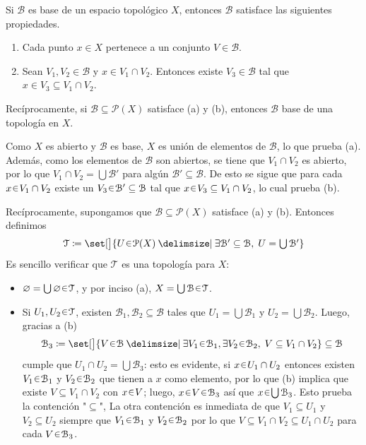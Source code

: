 \begin{ejer}
Si $\mathcal{B}$ es base de un espacio topológico $X$, entonces $\mathcal{B}$ satisface las siguientes propiedades.
\begin{enumerate}[label = (\alph*)]
    \item Cada punto $x\in X$ pertenece a un conjunto $V\in\mathcal{B}$.
    \item Sean $V_{1},V_{2}\in\mathcal{B}$ y $x\in V_{1}\cap V_{2}$. Entonces existe $V_{3}\in\mathcal{B}$ tal que $x\in V_{3}\subseteq V_{1}\cap V_{2}$.
\end{enumerate}
Recíprocamente, si $\mathcal{B}\subseteq\mathcal{P}(X)$ satisface (a) y (b), entonces $\mathcal{B}$ base de una topología en $X$.
\end{ejer}
\begin{sol}[Demostración]
Como $X$ es abierto y $\mathcal{B}$ es base, $X$ es unión de elementos de $\mathcal{B}$, lo que prueba (a). Además, como los elementos de $\mathcal{B}$ son abiertos, se tiene que $V_1 \cap V_2$ es abierto, por lo que $V_1 \cap V_2 = \bigcup \mathcal{B'}$ para algún $\mathcal{B'} \subseteq \mathcal{B}$. De esto se sigue que para cada $x \en V_1 \cap V_2$ existe un $V_3 \en \mathcal{B'} \subseteq \mathcal{B}$ tal que $x \en V_3 \subseteq V_1 \cap V_2$, lo cual prueba (b).\par
Recíprocamente, supongamos que $\mathcal{B} \subseteq \mathcal{P}(X)$ satisface (a) y (b). Entonces definimos
\[\textstyle
    \mathcal{T}%
    \coloneq \set[\big]{%
        U \en \mathcal{P}(X)%
        \given%
        \exists \mathcal{B'} \subseteq \mathcal{B},\; U = \bigcup \mathcal{B'}
    }
\]
Es sencillo verificar que $\mathcal{T}$ es una topología para $X$:
\begin{itemize}
\item $\varnothing = {\bigcup \varnothing} \en \mathcal{T}$, y por inciso (a), $X = {\bigcup \mathcal{B}} \en \mathcal{T}$.

\item Si $U_1, U_2 \en \mathcal{T}$, existen $\mathcal{B}_1, \mathcal{B}_2 \subseteq \mathcal{B}$ tales que $U_1 = \bigcup\mathcal{B}_1$ y $U_2 = \bigcup\mathcal{B}_2$. Luego, gracias a (b)
\[
    \mathcal{B}_3%
    \coloneq \set[\big]{%
        V \en \mathcal{B} \given \exists V_1 \en \mathcal{B}_1, \exists V_2 \en \mathcal{B}_2,\; V \subseteq V_1 \cap V_2
    }%
    \subseteq \mathcal{B}
\]
cumple que $U_1 \cap U_2 = \bigcup \mathcal{B}_3$: esto es evidente, si $x \en U_1 \cap U_2$ entonces existen $V_1 \en \mathcal{B}_1$ y $V_2 \en \mathcal{B}_2$ que tienen a $x$ como elemento, por lo que (b) implica que existe $V \subseteq V_1 \cap V_2$ con $x \en V$; luego, $x \en V \en \mathcal{B}_3$ así que $x \en \bigcup \mathcal{B}_3$. Esto prueba la contención "$\subseteq$", La otra contención es inmediata de que $V_1 \subseteq U_1$ y $V_2 \subseteq U_2$ siempre que $V_1 \en \mathcal{B}_1$ y $V_2 \en \mathcal{B}_2$ por lo que $V \subseteq V_1 \cap V_2 \subseteq U_1 \cap U_2$ para cada $V \en \mathcal{B}_3$.


\end{itemize}
\end{sol}
